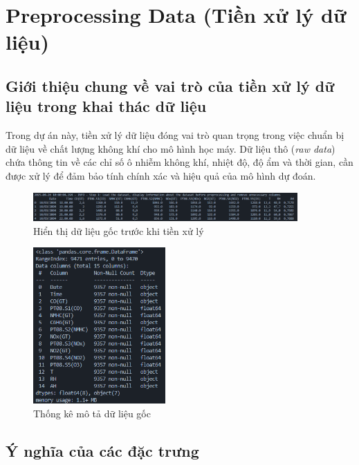 \section{Preprocessing Data (Tiền xử lý dữ liệu)}

\subsection{Giới thiệu chung về vai trò của tiền xử lý dữ liệu trong khai thác dữ liệu}

\hspace{0.5cm}Trong dự án này, tiền xử lý dữ liệu đóng vai trò quan trọng trong việc chuẩn bị dữ liệu về chất lượng không khí cho mô hình học máy. Dữ liệu thô (\textit{raw data}) chứa thông tin về các chỉ số ô nhiễm không khí, nhiệt độ, độ ẩm và thời gian, cần được xử lý để đảm bảo tính chính xác và hiệu quả của mô hình dự đoán.

\begin{figure}[htbp]
    \centering
    \includegraphics[width=0.9\textwidth]{images/raw_data_preview.png}
    \vspace{0.5cm}
    \caption{Hiển thị dữ liệu gốc trước khi tiền xử lý}
    \label{fig:raw_data_preview}
\end{figure}

\begin{figure}[htbp]
    \centering
    \includegraphics[width=0.45\textwidth]{images/raw_data_statistics.png}
    \vspace{0.5cm}
    \caption{Thống kê mô tả dữ liệu gốc}
    \label{fig:raw_data_statistics}
\end{figure}

\subsection{Ý nghĩa của các đặc trưng}

